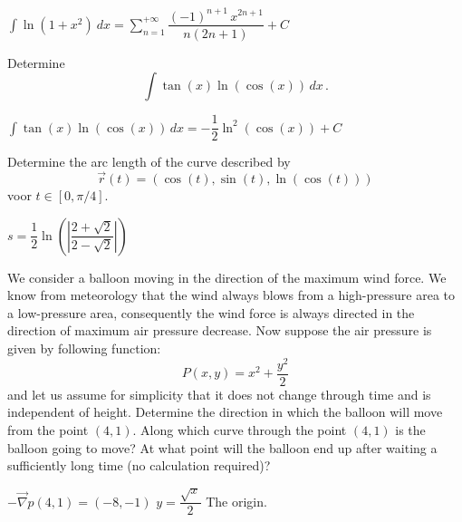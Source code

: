\begin{Answer}
$\displaystyle \int \ln\left(1+x^2\right) \ dx = \sum_{n=1}^{+\infty} \dfrac{(-1)^{n+1}\, x^{2n+1} }{n(2n+1)} + C$    
\end{Answer}



\begin{Exercise} Determine
$$
\displaystyle\int\tan(x)\ln\left(\cos(x)\right)\,dx\,.
$$
\end{Exercise}

\begin{Answer}
 $\displaystyle\int\tan(x)\ln\left(\cos(x)\right)\,dx = -\dfrac{1}{2}\ln^2(\cos(x)) + C$   
\end{Answer}





\begin{Exercise} Determine the arc length of the curve described by $$\vec{r}(t)=\left(\cos(t),\sin(t),\ln(\cos(t))\right)$$ voor $t\in[0,\pi/4]$.
\end{Exercise}

\begin{Answer}
$s = \dfrac{1}{2}\ln\left(\left|\dfrac{2+\sqrt{2}}{2-\sqrt{2}}\right|\right)$    
\end{Answer}




\begin{Exercise} We consider a balloon moving in the direction of the maximum wind force. We know from meteorology that the wind always blows from a high-pressure area to a low-pressure area, consequently the wind force is always directed in the direction of maximum air pressure decrease. Now suppose the air pressure is given by following function:
$$
P(x,y)=x^2+\dfrac{y^2}{2}
$$
and let us assume for simplicity that it does not change through time and is independent of height. 
\Question Determine the direction in which the balloon will move from the point $(4,1)$.
    \Question Along which curve through the point $(4,1)$ is the balloon going to move?
    \Question At what point will the balloon end up after waiting a sufficiently long time (no calculation required)? 
\end{Exercise}

\begin{Answer}

\Question $-\vec{\nabla} p(4,1) = (-8,-1)$
\Question $y = \dfrac{\sqrt{x}}{2}$
\Question The origin.
    
\end{Answer}



